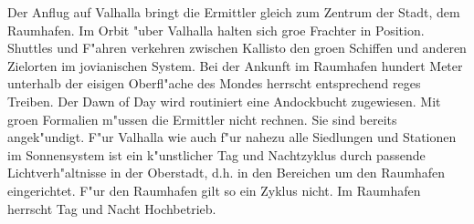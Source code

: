 
Der Anflug auf Valhalla bringt die Ermittler gleich zum Zentrum der Stadt, dem Raumhafen. Im Orbit "uber Valhalla halten sich gro\3e Frachter in Position. Shuttles und F"ahren verkehren zwischen Kallisto den gro\3en Schiffen und anderen Zielorten im jovianischen System. Bei der Ankunft im Raumhafen hundert Meter unterhalb der eisigen Oberfl"ache des Mondes herrscht entsprechend reges Treiben. Der Dawn of Day wird routiniert eine Andockbucht zugewiesen. Mit gro\3en Formalien m"ussen die Ermittler nicht rechnen. Sie sind bereits angek"undigt. F"ur Valhalla wie auch f"ur nahezu alle Siedlungen und Stationen im Sonnensystem ist ein k"unstlicher Tag und Nachtzyklus durch passende Lichtverh"altnisse in der Oberstadt, d.h. in den Bereichen um den Raumhafen eingerichtet. F"ur den Raumhafen gilt so ein Zyklus nicht. Im Raumhafen herrscht Tag und Nacht Hochbetrieb. 
